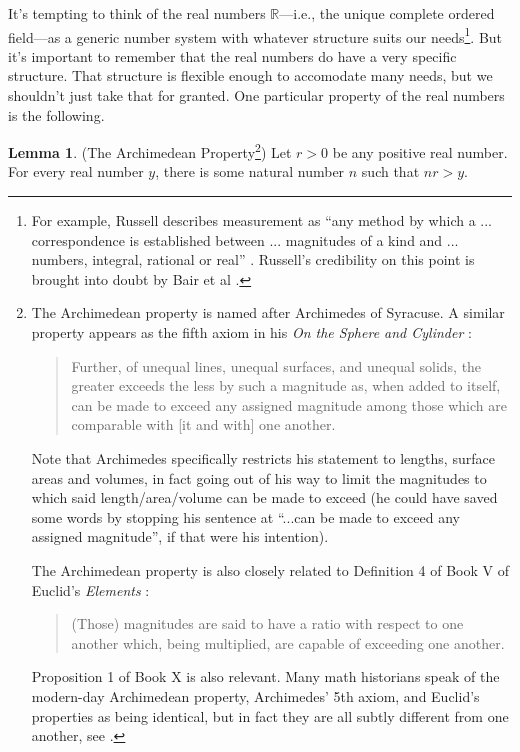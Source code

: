 \documentclass[reqno]{article}
\theoremstyle{definition}
\newtheorem{lemma}[theorem]{Lemma}
\begin{document}
It's tempting to think of the real numbers $\mathbb R$---i.e., the unique
complete ordered field---as a generic number system with whatever
structure suits our needs\footnote{For example, Russell describes
measurement as ``any method by which a ... correspondence
is established between ... magnitudes of a kind and ... numbers,
integral, rational or real'' \cite{russell}. Russell's credibility on this point
is brought into doubt by Bair et al \cite{bair2013mathematical}.}. But it's
important to remember that the
real numbers do have a very specific structure. That structure is
flexible enough to accomodate many needs, but we shouldn't just
take that for granted. One particular property of the real numbers
is the following.

\begin{lemma}
\label{specializedarchimedeanlemma}
(The Archimedean Property\footnote{The Archimedean property is named after Archimedes of Syracuse.
A similar property appears as the fifth axiom in his \emph{On the Sphere
and Cylinder} \cite{archimedes}:
\begin{quote}
    Further, of unequal lines, unequal surfaces, and unequal
    solids, the greater exceeds the less by such a magnitude
    as, when added to itself, can be made to exceed any
    assigned magnitude among those which are comparable with
    [it and with] one another.
\end{quote}
Note that Archimedes specifically restricts his statement to
lengths, surface areas and volumes, in fact going out of his
way to limit the magnitudes to which said length/area/volume
can be made to exceed (he could have saved some words
by stopping his sentence at ``...can be made to exceed any
assigned magnitude'', if that were his intention).

The Archimedean property is also closely related to Definition 4 of Book V of Euclid's
\emph{Elements} \cite{euclid}:
\begin{quote}
    (Those) magnitudes are said to have a ratio
    with respect to one another which, being
    multiplied, are capable of exceeding one
    another.
\end{quote}
Proposition 1 of Book X is also relevant.
Many math historians
speak of the modern-day Archimedean property, Archimedes' 5th axiom, and Euclid's
properties as being identical, but in fact they are all subtly different from one
another, see \cite{bair2013mathematical}.})
Let $r>0$ be any positive real number.
For every real number $y$, there is some natural number $n$
such that $nr>y$.
\end{lemma}
\end{document}
